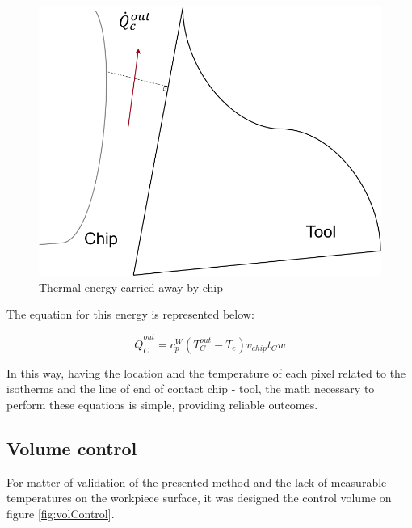 	\begin{figure}[H]
		\centering
		\captionsetup{justification=centering}
		\includegraphics[scale=0.6]{Cap4/energyChip.png}
		\caption{Thermal energy carried away by chip}
		\label{fig:energychip}
	\end{figure}

	The equation for this energy is represented below:

	\begin{equation} 
	\label{eq_energychip}
		\dot{Q}_{C}^{out} = c_{p}^{W}(T_{C}^{out} - T_{e})v_{chip}t_{C}w
	\end{equation}

	In this way, having the location and the temperature of each pixel related to the isotherms and the line of end of contact chip - tool, the math necessary to perform these equations is simple, providing reliable outcomes.

	\subsection{Volume control}

	For matter of validation of the presented method and the lack of measurable temperatures on the workpiece surface, it was designed the control volume on figure \ref{fig:volControl}.

